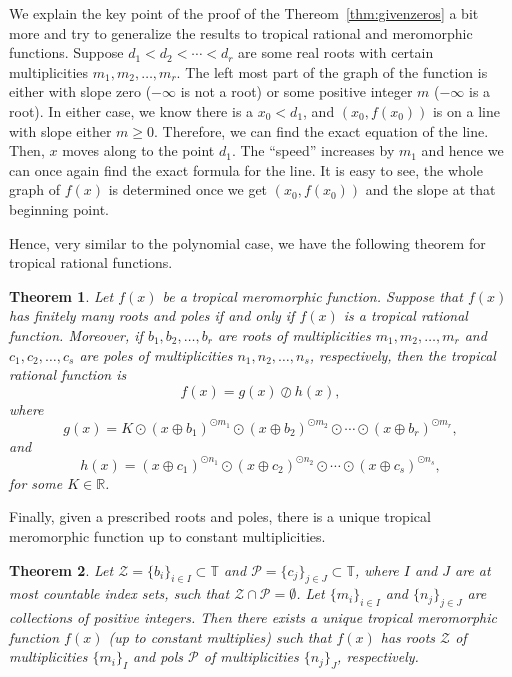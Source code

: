 \documentclass{amsart}
\newtheorem{thm}{Theorem}[section]
\theoremstyle{definition}
\theoremstyle{remark}
\begin{document}
We explain the key point of the proof of the Thereom~\ref{thm:givenzeros} a bit more and try to generalize the results to tropical rational and meromorphic functions. Suppose $d_1 < d_2 < \cdots < d_r$ are some real roots with certain multiplicities $m_1, m_2, \ldots, m_r$. The left most part of the graph of the function is either with slope zero ($-\infty$ is not a root) or some positive integer $m$ ($-\infty$ is a root). In either case, we know there is a $x_0 < d_1$, and $(x_0, f(x_0))$ is on a line with slope either $m\geq 0$. Therefore, we can find the exact equation of the line. Then, $x$ moves along to the point $d_1$. The ``speed'' increases by $m_1$ and hence we can once again find the exact formula for the line. It is easy to see, the whole graph of $f(x)$ is determined once we get $(x_0, f(x_0))$ and the slope at that beginning point. 

Hence, very similar to the polynomial case, we have the following theorem for tropical rational functions.

\begin{thm}\label{thm:givenrational}
Let $f(x)$ be a tropical meromorphic function. Suppose that $f(x)$ has finitely many roots and poles if and only if $f(x)$ is a tropical rational function. Moreover, if $b_1, b_2, \ldots, b_r$ are roots of multiplicities $m_1, m_2, \ldots, m_r$ and $c_1, c_2, \ldots, c_s$ are poles of multiplicities $n_1, n_2, \ldots, n_s$, respectively, then the tropical rational function is 
\[
f(x) = g(x) {\oslash} h(x),
\]
where
\[
g(x) = K {\odot} (x {\oplus} b_1)^{{\odot} m_1} {\odot} (x {\oplus} b_2)^{{\odot} m_2} {\odot} \cdots {\odot} (x {\oplus} b_r)^{{\odot} m_r},
\]
and
\[
h(x) = (x {\oplus} c_1)^{{\odot} n_1} {\odot} (x {\oplus} c_2)^{{\odot} n_2} {\odot} \cdots {\odot} (x {\oplus} c_s)^{{\odot} n_s},
\]
for some $K \in {\mathbb{R}}$.
\end{thm}

Finally, given a prescribed roots and poles, there is a unique tropical meromorphic function up to constant multiplicities.

\begin{thm}\label{thm:givenmero}
Let $\mathcal{Z} = \{b_i\}_{i \in I} \subset {\mathbb{T}}$ and $\mathcal{P} = \{c_j \}_{j \in J} \subset {\mathbb{T}}$, where $I$ and $J$ are at most countable index sets,  such that $\mathcal{Z} \cap \mathcal{P} = \emptyset$. Let $\{ m_i \}_{i \in I}$ and $\{ n_j \}_{j \in J}$ are collections of positive integers. Then there exists a unique tropical meromorphic function $f(x)$ (up to constant multiplies) such that $f(x)$ has roots $\mathcal{Z}$ of multiplicities $\{ m_i \}_I$ and pols $\mathcal{P}$ of multiplicities $\{ n_j \}_J$, respectively.
\end{thm}
\end{document}
